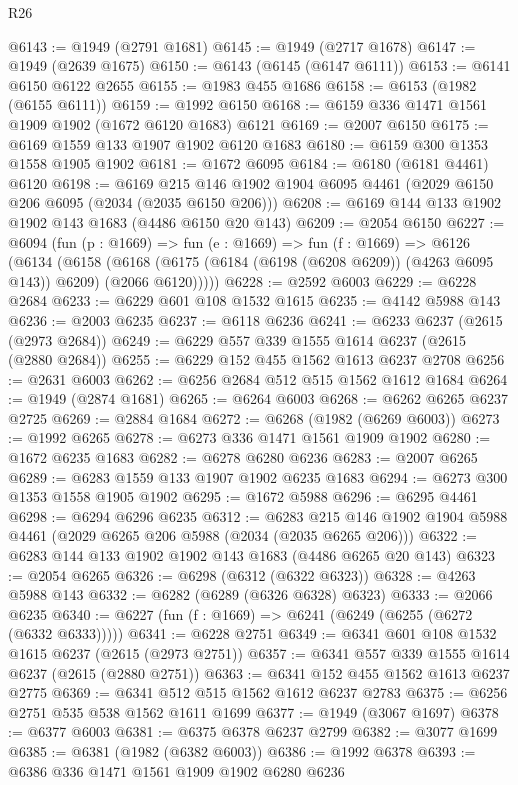 \begin{lexlean}{R26}
\begin{coremodule}
@6143 := @1949 (@2791 @1681)
@6145 := @1949 (@2717 @1678)
@6147 := @1949 (@2639 @1675)
@6150 := @6143 (@6145 (@6147 @6111))
@6153 := @6141 @6150 @6122 @2655
@6155 := @1983 @455 @1686
@6158 := @6153 (@1982 (@6155 @6111))
@6159 := @1992 @6150
@6168 := @6159 @336 @1471 @1561 @1909 @1902 (@1672 @6120 @1683) @6121
@6169 := @2007 @6150
@6175 := @6169 @1559 @133 @1907 @1902 @6120 @1683
@6180 := @6159 @300 @1353 @1558 @1905 @1902
@6181 := @1672 @6095
@6184 := @6180 (@6181 @4461) @6120
@6198 := @6169 @215 @146 @1902 @1904 @6095 @4461 (@2029 @6150 @206 @6095 (@2034 (@2035 @6150 @206)))
@6208 := @6169 @144 @133 @1902 @1902 @143 @1683 (@4486 @6150 @20 @143)
@6209 := @2054 @6150
@6227 := @6094
    (fun (p : @1669) =>
    fun (e : @1669) =>
    fun (f : @1669) =>
    @6126
      (@6134
        (@6158
          (@6168 (@6175 (@6184 (@6198 (@6208 @6209)) (@4263 @6095 @143)) @6209) (@2066 @6120)))))
@6228 := @2592 @6003
@6229 := @6228 @2684
@6233 := @6229 @601 @108 @1532 @1615
@6235 := @4142 @5988 @143
@6236 := @2003 @6235
@6237 := @6118 @6236
@6241 := @6233 @6237 (@2615 (@2973 @2684))
@6249 := @6229 @557 @339 @1555 @1614 @6237 (@2615 (@2880 @2684))
@6255 := @6229 @152 @455 @1562 @1613 @6237 @2708
@6256 := @2631 @6003
@6262 := @6256 @2684 @512 @515 @1562 @1612 @1684
@6264 := @1949 (@2874 @1681)
@6265 := @6264 @6003
@6268 := @6262 @6265 @6237 @2725
@6269 := @2884 @1684
@6272 := @6268 (@1982 (@6269 @6003))
@6273 := @1992 @6265
@6278 := @6273 @336 @1471 @1561 @1909 @1902
@6280 := @1672 @6235 @1683
@6282 := @6278 @6280 @6236
@6283 := @2007 @6265
@6289 := @6283 @1559 @133 @1907 @1902 @6235 @1683
@6294 := @6273 @300 @1353 @1558 @1905 @1902
@6295 := @1672 @5988
@6296 := @6295 @4461
@6298 := @6294 @6296 @6235
@6312 := @6283 @215 @146 @1902 @1904 @5988 @4461 (@2029 @6265 @206 @5988 (@2034 (@2035 @6265 @206)))
@6322 := @6283 @144 @133 @1902 @1902 @143 @1683 (@4486 @6265 @20 @143)
@6323 := @2054 @6265
@6326 := @6298 (@6312 (@6322 @6323))
@6328 := @4263 @5988 @143
@6332 := @6282 (@6289 (@6326 @6328) @6323)
@6333 := @2066 @6235
@6340 := @6227 (fun (f : @1669) => @6241 (@6249 (@6255 (@6272 (@6332 @6333)))))
@6341 := @6228 @2751
@6349 := @6341 @601 @108 @1532 @1615 @6237 (@2615 (@2973 @2751))
@6357 := @6341 @557 @339 @1555 @1614 @6237 (@2615 (@2880 @2751))
@6363 := @6341 @152 @455 @1562 @1613 @6237 @2775
@6369 := @6341 @512 @515 @1562 @1612 @6237 @2783
@6375 := @6256 @2751 @535 @538 @1562 @1611 @1699
@6377 := @1949 (@3067 @1697)
@6378 := @6377 @6003
@6381 := @6375 @6378 @6237 @2799
@6382 := @3077 @1699
@6385 := @6381 (@1982 (@6382 @6003))
@6386 := @1992 @6378
@6393 := @6386 @336 @1471 @1561 @1909 @1902 @6280 @6236

\end{coremodule}
\end{lexlean}
